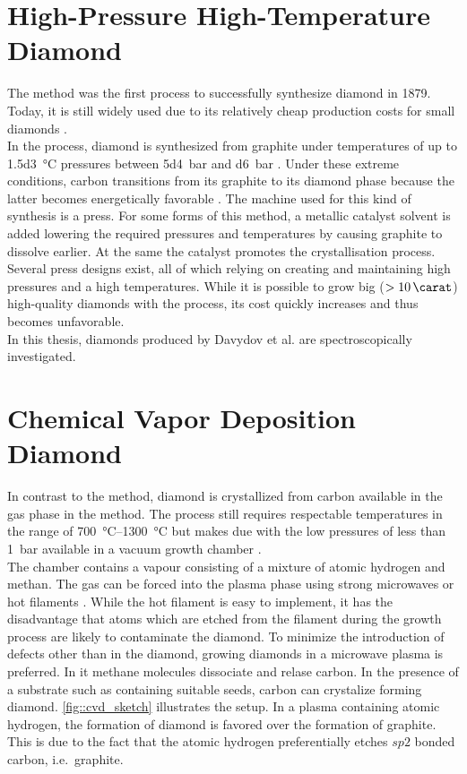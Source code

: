 \section[HPHT]{High-Pressure High-Temperature Diamond}\label{sec::hpht}

	The \HPHT method was the first process to successfully synthesize diamond in 1879.
	Today, it is still widely used due to its relatively cheap production costs for small diamonds \cite{wikiSyntheticDiamond}.
	\\
	In the \HPHT process, diamond is synthesized from graphite under temperatures of up to \SI{1.5d3}{\celsius} pressures between \SI{5d4}{bar} and \SI{d6}{bar} \cite{davis1993diamond}. Under these extreme conditions, carbon transitions from its graphite to its diamond phase because the latter becomes energetically favorable \cite{janine::135, janine::136, janine::137, janine::138}.
	The machine used for this kind of synthesis is a press.
	For some forms of this method, a metallic catalyst solvent is added lowering the required pressures and temperatures by causing graphite to dissolve earlier. At the same the catalyst promotes the crystallisation process.
	Several press designs exist, all of which relying on creating and maintaining high pressures and a high temperatures.
	While it is possible to grow big ($> \SI{10}{\carat}$) high-quality diamonds with the \HPHT process, its cost quickly increases and thus becomes unfavorable.
	\\
	In this thesis, \HPHT \nds diamonds produced by Davydov et al. \cite{Davydov2014} are spectroscopically investigated.


\section[CVD]{Chemical Vapor Deposition Diamond}\label{sec::cvd}




	In contrast to the \HPHT method, diamond is crystallized from carbon available in the gas phase in the \CVD method.
	The process still requires respectable temperatures in the range of \SIrange{700}{1300}{\celsius} but makes due with the low pressures of less than \SI{1}{\bar} available in a vacuum growth chamber \cite{janine::141}.
	\\
	The chamber contains a vapour consisting of a mixture of atomic hydrogen and methan. The gas can be forced into the plasma phase using strong microwaves or hot filaments \cite{neu::75, neu::78, neu::79}. While the hot filament is easy to implement, it has the disadvantage that atoms which are etched from the filament during the growth process are likely to contaminate the diamond. To minimize the introduction of defects other than \sivs in the diamond, growing diamonds in a microwave plasma is preferred. In it methane molecules dissociate and relase carbon. In the presence of a substrate such as \ir containing suitable seeds, carbon can crystalize forming diamond. \autoref{fig::cvd_sketch} illustrates the setup. In a plasma containing atomic hydrogen, the formation of diamond is favored over the formation of graphite. This is due to the fact that the atomic hydrogen preferentially etches $sp2$ bonded carbon, i.e.\ graphite.

